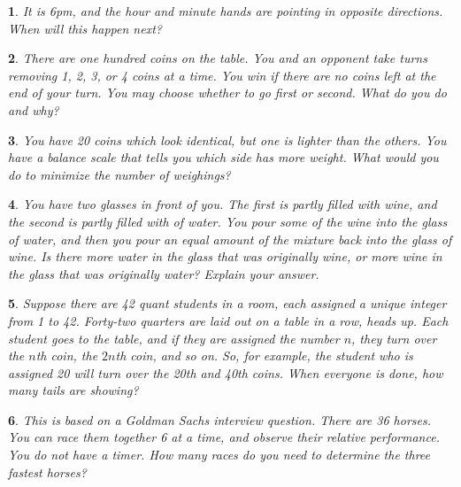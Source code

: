 \documentclass{report}
\newtheorem{problem}{}
\numberwithin{problem}{chapter} %
\begin{document}
\begin{problem}
It is 6pm, and the hour and minute hands are pointing in opposite directions. When will this happen next?
\end{problem}

\begin{problem}
There are one hundred coins on the table. You and an opponent take turns removing 1, 2, 3, or 4 coins at a time. You win if there are no coins left at the end of your turn. You may choose whether to go first or second. What do you do and why?
\end{problem}

\begin{problem}
You have 20 coins which look identical, but one is lighter than the others. You have a balance scale that tells you which side has more weight. What would you do to minimize the number of weighings?
\end{problem}

\begin{problem}
You have two glasses in front of you. The first is partly filled with wine, and the second is partly filled with of water. You pour some of the wine into the glass of water, and then you pour an equal amount of the mixture back into the glass of wine. Is there more water in the glass that was originally wine, or more wine in the glass that was originally water? Explain your answer.
\end{problem}

\begin{problem}
Suppose there are 42 quant students in a room, each assigned a unique integer from 1 to 42. Forty-two quarters are laid out on a table in a row, heads up. Each student goes to the table, and if they are assigned the number $n$, they turn over the $n$th coin, the $2n$th coin, and so on. So, for example, the student who is assigned 20 will turn over the 20th and 40th coins. When everyone is done, how many tails are showing?
\end{problem}

\begin{problem}
This is based on a Goldman Sachs interview question. There are 36 horses. You can race them together 6 at a time, and observe their relative performance. You do not have a timer. How many races do you need to determine the three fastest horses?
\end{problem}

\printbibliography
\end{document}
